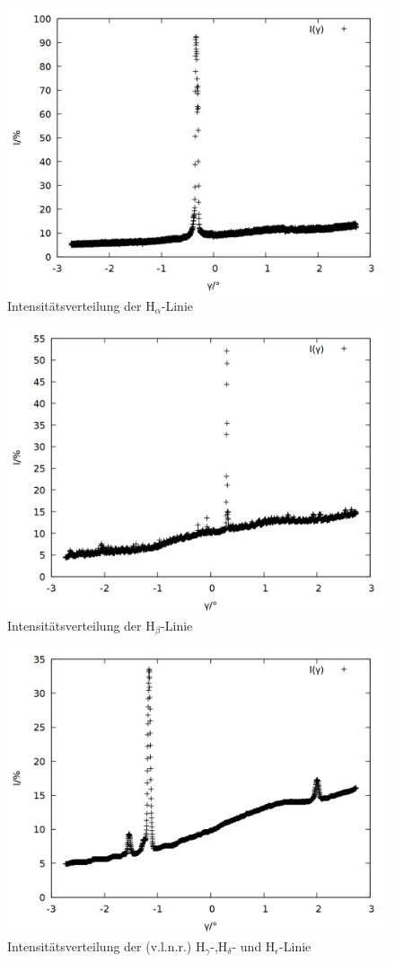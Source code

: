 \begin{figure}[h]
  \centering
  \includegraphics[width=0.75\linewidth]{data/Balmer/out_red_raw.png}
  \caption{Intensitätsverteilung der H$_\alpha$-Linie}
  \label{fig:red_raw}
\end{figure}
\begin{figure}[h]
  \centering
  \includegraphics[width=0.75\linewidth]{data/Balmer/out_lightblue_raw.png}
  \caption{Intensitätsverteilung der H$_\beta$-Linie}
  \label{fig:lightblue_raw}
\end{figure}
\begin{figure}[h]
  \centering
  \includegraphics[width=0.75\linewidth]{data/Balmer/out_blue_raw.png}
  \caption{Intensitätsverteilung der (v.l.n.r.) H$_\gamma$-,H$_\delta$- und H$_\epsilon$-Linie}
  \label{fig:blue_raw}
\end{figure}

